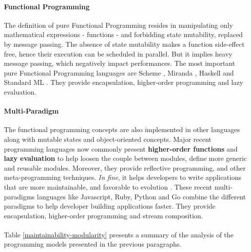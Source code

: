 \paragraph{Functional Programming} \label{chapter3:software-maintainability:programming-models:functional-programming}


The definition of pure Functional Programming resides in manipulating only mathematical expressions - functions - and forbidding state mutability, replaced by message passing.
The absence of state mutability makes a function side-effect free, hence their execution can be scheduled in parallel.
But it implies heavy message passing, which negatively impact performances.
The most important pure Functional Programming languages are Scheme \cite{Rees1986}, Miranda \cite{Turner1986}, Haskell \cite{Hudak1992} and Standard ML \cite{Milner1997}.
They provide encapsulation, higher-order programming and lazy evaluation.

\paragraph{Multi-Paradigm}

The functional programming concepts are also implemented in other languages along with mutable states and object-oriented concepts.
Major recent programming languages now commonly present \textbf{higher-order functions} and \textbf{lazy evaluation} to help loosen the couple between modules, define more generic and reusable modules.
Moreover, they provide reflective programming, and other meta-programming techniques.
\textit{In fine}, it helps developers to write applications that are more maintainable, and favorable to evolution \cite{Hughes1989,Turner1981}.
These recent multi-paradigms languages like Javascript, Ruby, Python and Go combine the different paradigms to help developer building applications faster.
They provide encapsulation, higher-order programming and stream composition.

\paragraph{}

Table \ref{maintainability-modularity} presents a summary of the analysis of the programming models presented in the previous paragraphs.

